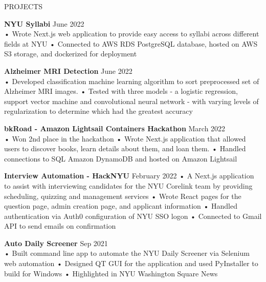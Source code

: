 \documentclass{resume} %
\begin{document}
\begin{rSection}{PROJECTS}

\textbf{\bf NYU Syllabi } \hfill June 2022 \\
• Wrote Next.js web application to provide easy access to syllabi across different fields at NYU \newline
• Connected to AWS RDS PostgreSQL database, hosted on AWS S3 storage, and dockerized for deployment

\textbf{\bf Alzheimer MRI Detection } \hfill June 2022 \\
• Developed classification machine learning algorithm to sort preprocessed set of Alzheimer MRI images. 
\newline
• Tested with three models - a logistic regression, support vector machine and convolutional neural network - with varying levels of regularization to determine which had the greatest accuracy 

\textbf{\bf bkRoad - Amazon Lightsail Containers Hackathon } \hfill March 2022 \\
• Won 2nd place in the hackathon \newline
• Wrote Next.js application that allowed users to discover books, learn details about them, and loan them. \newline
• Handled connections to SQL Amazon DynamoDB and hosted on Amazon Lightsail

\textbf{\bf Interview Automation - HackNYU} \hfill February 2022 \newline
• A Next.js application to assist with interviewing candidates for the NYU Corelink team by providing scheduling, quizzing and management services\newline
• Wrote React pages for the question page, admin creation page, and applicant information \newline
• Handled authentication via Auth0 configuration of NYU SSO logon  \newline
• Connected to Gmail API to send emails on confirmation

\textbf{\bf Auto Daily Screener } \hfill Sep 2021 \\
• Built command line app to automate the NYU Daily Screener via Selenium web automation
\newline
• Designed QT GUI for the application and used PyInstaller to build for Windows \newline
• Highlighted in NYU Washington Square News



\end{rSection}
\end{document}
